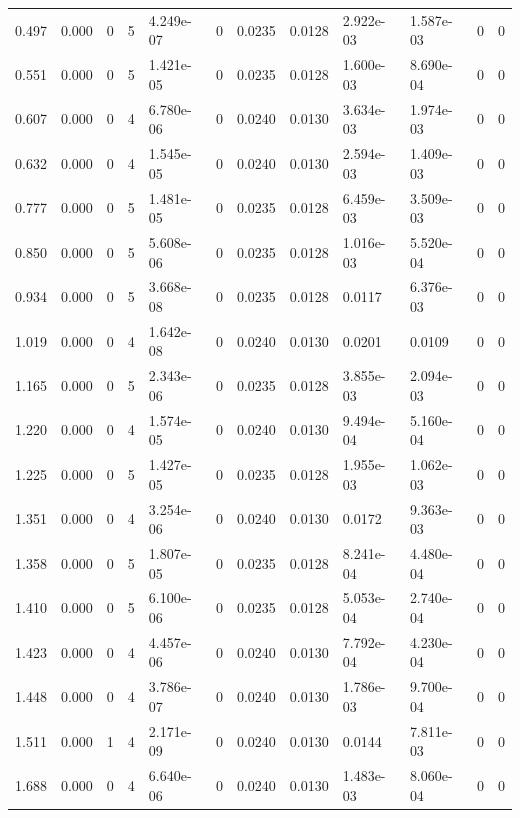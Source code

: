 \documentclass[preview]{standalone}
\begin{document}
{{\begin{tabular}{L{1.2cm}C{1.2cm} C{0.3cm}C{0.5cm} C{1.4cm}C{1.4cm} C{1.4cm}C{1.4cm} C{1.6cm}C{1.6cm} C{1.6cm}C{1.6cm}}
  0.497  &  0.000  & 0     &  5 &  4.249e-07  & 0  &  0.0235&   0.0128& 2.922e-03 & 1.587e-03   &  0 & 0  \\ 
  0.551  &  0.000  & 0     &  5 &  1.421e-05  & 0  &  0.0235&   0.0128& 1.600e-03 & 8.690e-04   &  0 & 0  \\ 
  0.607  &  0.000  & 0     &  4 &  6.780e-06  & 0  &  0.0240&   0.0130& 3.634e-03 & 1.974e-03   &  0 & 0  \\ 
  0.632  &  0.000  & 0     &  4 &  1.545e-05  & 0  &  0.0240&   0.0130& 2.594e-03 & 1.409e-03   &  0 & 0  \\ 
  0.777  &  0.000  & 0     &  5 &  1.481e-05  & 0  &  0.0235&   0.0128& 6.459e-03 & 3.509e-03   &  0 & 0  \\ 
  0.850  &  0.000  & 0     &  5 &  5.608e-06  & 0  &  0.0235&   0.0128& 1.016e-03 & 5.520e-04   &  0 & 0  \\ 
  0.934  &  0.000  & 0     &  5 &  3.668e-08  & 0  &  0.0235&   0.0128& 0.0117 & 6.376e-03   &  0 & 0  \\ 
  1.019  &  0.000  & 0     &  4 &  1.642e-08  & 0  &  0.0240&   0.0130& 0.0201 & 0.0109   &  0 & 0  \\ 
  1.165  &  0.000  & 0     &  5 &  2.343e-06  & 0  &  0.0235&   0.0128& 3.855e-03 & 2.094e-03   &  0 & 0  \\ 
  1.220  &  0.000  & 0     &  4 &  1.574e-05  & 0  &  0.0240&   0.0130& 9.494e-04 & 5.160e-04   &  0 & 0  \\ 
  1.225  &  0.000  & 0     &  5 &  1.427e-05  & 0  &  0.0235&   0.0128& 1.955e-03 & 1.062e-03   &  0 & 0  \\ 
  1.351  &  0.000  & 0     &  4 &  3.254e-06  & 0  &  0.0240&   0.0130& 0.0172 & 9.363e-03   &  0 & 0  \\ 
  1.358  &  0.000  & 0     &  5 &  1.807e-05  & 0  &  0.0235&   0.0128& 8.241e-04 & 4.480e-04   &  0 & 0  \\ 
  1.410  &  0.000  & 0     &  5 &  6.100e-06  & 0  &  0.0235&   0.0128& 5.053e-04 & 2.740e-04   &  0 & 0  \\ 
  1.423  &  0.000  & 0     &  4 &  4.457e-06  & 0  &  0.0240&   0.0130& 7.792e-04 & 4.230e-04   &  0 & 0  \\ 
  1.448  &  0.000  & 0     &  4 &  3.786e-07  & 0  &  0.0240&   0.0130& 1.786e-03 & 9.700e-04   &  0 & 0  \\ 
  1.511  &  0.000  & 1     &  4 &  2.171e-09  & 0  &  0.0240&   0.0130& 0.0144 & 7.811e-03   &  0 & 0  \\ 
  1.688  &  0.000  & 0     &  4 &  6.640e-06  & 0  &  0.0240&   0.0130& 1.483e-03 & 8.060e-04   &  0 & 0  \\ 

\end{tabular}}}
\end{document}
